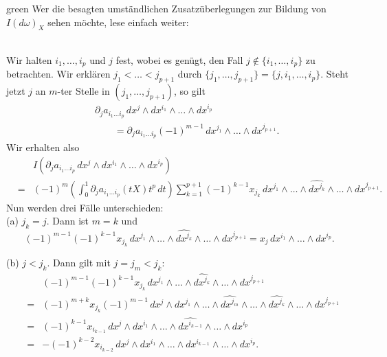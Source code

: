 \documentclass[a4paper,twoside,DIV15,BCOR12mm]{scrbook}
\begin{document}
\noindent
\begin{color}{green}
Wer die besagten umständlichen Zusatzüberlegungen zur Bildung von $I(d\omega)_X$ sehen möchte, 
lese einfach weiter:\end{color}\\

\noindent
Wir halten $i_{1},\dots,i_{p}$ und $j$ fest, wobei es 
genügt, den Fall $j \notin \{i_{1},\dots,i_{p}\}$ zu betrachten. Wir 
erklären $j_{1} < \dots < j_{p+1}$ durch $\{j_{1},\dots,j_{p+1}\} = 
\{j,i_{1},\dots,i_{p}\}$. Steht jetzt $j$ an $m$-ter Stelle in 
$(j_{1},\dots,j_{p+1})$, so gilt
\begin{eqnarray*}
&   & \partial_{j} a_{i_{1} \dots i_{p}} \, dx^{j} \wedge dx^{i_1} 
\wedge \dots \wedge dx^{i_p} \\
&   & \qquad = \partial_{j} a_{i_{1} \dots i_{p}} (-1)^{m-1}\, 
dx^{j_1} \wedge \dots \wedge dx^{j_{p+1}}.
\end{eqnarray*}
Wir erhalten also
\begin{eqnarray*}
&   & I(\partial_{j} a_{i_{1}\dots i_{p}} \, dx^{j} \wedge dx^{i_1} 
\wedge \dots \wedge dx^{i_p}) \\
& = & (-1)^{m} \left(\int_{0}^{1} \partial_{j}a_{i_{1}\dots i_{p}}(tX) 
t^{p}\, dt\right) \sum_{k=1}^{p+1} (-1)^{k-1} x_{j_k} \, dx^{j_1} 
\wedge \dots \wedge \widehat{dx^{j_k}} \wedge \dots \wedge 
dx^{j_{p+1}}.
\end{eqnarray*}
Nun werden drei Fälle unterschieden:\\

\noindent
(a) $j_{k} = j$. Dann ist $m = k$ und
\[ (-1)^{m-1}(-1)^{k-1} x_{j_k} \, dx^{j_1} \wedge \dots \wedge 
\widehat{dx^{j_k}} \wedge \dots \wedge dx^{j_{p+1}} 
 =  x_{j} \, dx^{i_1} \wedge \dots \wedge dx^{i_p}.
\]

\noindent
(b) $j < j_{k}$. Dann gilt mit $j = j_{m} < j_{k}$:
\begin{eqnarray*}
&   & (-1)^{m-1}(-1)^{k-1} x_{j_k} \, dx^{j_1} \wedge \dots \wedge 
\widehat{dx^{j_k}} \wedge \dots \wedge dx^{j_{p+1}} \\
& = & (-1)^{m+k} x_{j_k} (-1)^{m-1}\, dx^{j} \wedge dx^{j_1} \wedge 
\dots \wedge \widehat{dx^{j_m}} \wedge \dots \wedge 
\widehat{dx^{j_k}} \wedge \dots \wedge dx^{j_{p+1}} \\
& = & (-1)^{k-1} x_{i_{k-1}} \, dx^{j} \wedge dx^{i_1} \wedge \dots 
\wedge \widehat{dx^{i_{k-1}}} \wedge \dots \wedge dx^{i_p} \\
& = & -(-1)^{k-2} x_{i_{k-2}} \, dx^{j} \wedge dx^{i_1} \wedge \dots 
\wedge dx^{i_{k-1}} \wedge \dots \wedge dx^{i_p}.
\end{eqnarray*}
\end{document}
